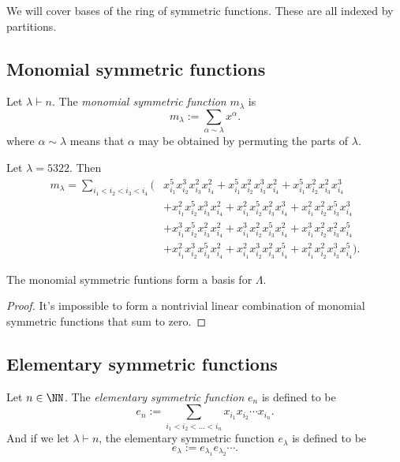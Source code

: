 \documentclass{article}
\begin{document}
We will cover bases of the ring of symmetric functions. These are all indexed by partitions.

\subsection{Monomial symmetric functions}

\begin{definition}
    Let $\lambda \vdash n$. The \textit{monomial symmetric function} $m_\lambda$ is 
    \[
        m_\lambda := \sum_{\alpha \sim \lambda} x^\alpha.
    \]
    where $\alpha \sim \lambda$ means that $\alpha$ may be obtained by permuting the parts of $\lambda$.
\end{definition}

\begin{example}
    Let $\lambda = 5322$. Then
    \begin{align*}
        m_\lambda = \sum_{i_1<i_2<i_3<i_4} \Big(&x_{i_1}^5x_{i_2}^3x_{i_3}^2x_{i_4}^2 + x_{i_1}^5x_{i_2}^2x_{i_3}^3x_{i_4}^2 + x_{i_1}^5x_{i_2}^2x_{i_3}^2x_{i_4}^3 \\ 
                                           &+ x_{i_1}^2x_{i_2}^5x_{i_3}^3x_{i_4}^2 + x_{i_1}^2x_{i_2}^5x_{i_3}^2x_{i_4}^3 + x_{i_1}^2x_{i_2}^2x_{i_3}^5x_{i_4}^3  \\
                                           &+ x_{i_1}^3x_{i_2}^5x_{i_3}^2x_{i_4}^2 + x_{i_1}^3x_{i_2}^2x_{i_3}^5x_{i_4}^2 + x_{i_1}^3x_{i_2}^2x_{i_3}^2x_{i_4}^5  \\
                                           &+ x_{i_1}^2x_{i_2}^3x_{i_3}^5x_{i_4}^2 + x_{i_1}^2x_{i_2}^3x_{i_3}^2x_{i_4}^5 + x_{i_1}^2x_{i_2}^2x_{i_3}^3x_{i_4}^5 \Big).
    \end{align*}
\end{example}

\begin{theorem}
    The monomial symmetric funtions form a basis for $\Lambda$.
\end{theorem}

\begin{proof}
    It's impossible to form a nontrivial linear combination of monomial symmetric functions that sum to zero.
\end{proof}

\subsection{Elementary symmetric functions}

\begin{definition}
    Let $n\in\NN$. The \textit{elementary symmetric function} $e_n$ is defined to be
    \[
        e_n := \sum_{i_1<i_2<\ldots<i_n} x_{i_1}x_{i_2}\cdots x_{i_n}.
    \]
    And if we let $\lambda \vdash n$, the elementary symmetric function $e_\lambda$ is defined to be
    \[
        e_\lambda := e_{\lambda_1}e_{\lambda_2}\cdots.
    \]
\end{definition}
\end{document}
